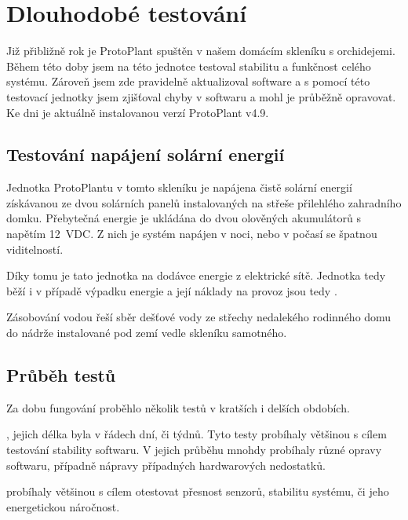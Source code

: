 \chapter{Dlouhodobé testování}
Již přibližně rok je ProtoPlant spuštěn v našem domácím skleníku s orchidejemi.
Během této doby jsem na této jednotce testoval stabilitu a funkčnost celého systému. 
Zároveň jsem zde pravidelně aktualizoval software a s pomocí této testovací jednotky jsem zjišťoval chyby v softwaru a mohl je průběžně opravovat.
Ke dni  je aktuálně instalovanou verzí ProtoPlant v4.9.

\section{Testování napájení solární energií}
Jednotka ProtoPlantu v tomto skleníku je napájena čistě solární energií získávanou ze dvou solárních panelů instalovaných na střeše přilehlého zahradního domku.
Přebytečná energie je ukládána do dvou olověných akumulátorů s napětím 12~VDC.
Z nich je systém napájen v noci, nebo v počasí se špatnou viditelností.

Díky tomu je tato jednotka  na dodávce energie z elektrické sítě.
Jednotka tedy běží i v případě výpadku energie a její náklady na provoz jsou tedy .

Zásobování vodou řeší sběr dešťové vody ze střechy nedalekého rodinného domu do nádrže instalované pod zemí vedle skleníku samotného.

\section{Průběh testů}
Za dobu fungování proběhlo několik testů v kratších i delších obdobích. \newline

\noindent{}, jejich délka byla v řádech dní, či týdnů. 
Tyto testy probíhaly většinou s cílem testování stability softwaru.
V jejich průběhu mnohdy probíhaly různé opravy softwaru, případně nápravy případných hardwarových nedostatků. \newline

\noindent{} probíhaly většinou s cílem otestovat přesnost senzorů, stabilitu systému, či jeho energetickou náročnost. 

\newpage